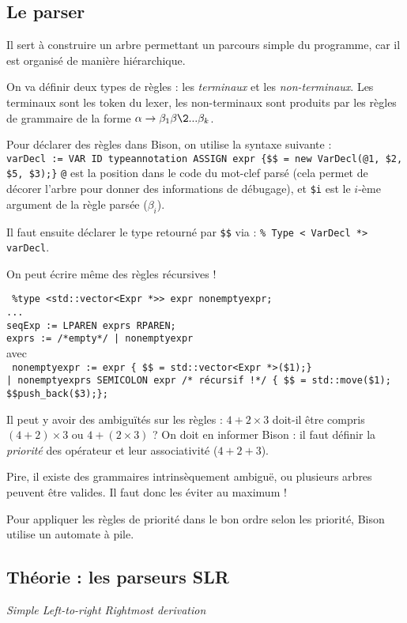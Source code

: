 \documentclass{article}
\begin{document}
\subsection{Le parser}
Il sert à construire un arbre permettant un parcours simple du programme, car il est organisé de manière hiérarchique. 

On va définir deux types de règles : les \emph{terminaux} et les \emph{non-terminaux}. Les terminaux sont les token du lexer, les non-terminaux sont produits par les règles de grammaire de la forme $\alpha \to \beta_1\beta\2...\beta_k$.

Pour déclarer des règles dans Bison, on utilise la syntaxe suivante :\\
\texttt{varDecl := VAR ID typeannotation ASSIGN expr \{\$\$ = new VarDecl(@1, \$2, \$5, \$3);\}}
\texttt{@} est la position dans le code du mot-clef parsé (cela permet de décorer l'arbre pour donner des informations de débugage), et \texttt{\$i} est le $i$-ème argument de la règle parsée ($\beta_i$).

Il faut ensuite déclarer le type retourné par \texttt{\$\$} via :
\texttt{\% Type < VarDecl *> varDecl}.

On peut écrire même des règles récursives !
\bigskip\noindent


\texttt{
\%type <std::vector<Expr *>> expr nonemptyexpr;\\
...\\
seqExp := LPAREN exprs RPAREN;\\
exprs := /*empty*/ | nonemptyexpr}\\
avec\\
\texttt{
nonemptyexpr := expr \{ \$\$ = std::vector<Expr *>({\$1});\}\\
| nonemptyexprs SEMICOLON expr /* récursif !*/ \{ \$\$ = std::move(\$1); \$\$push\_back(\$3);\};
}

Il peut y avoir des ambiguïtés sur les règles : $4+2\times 3$ doit-il être compris $(4+2)\times 3$ ou $4+(2\times 3)$ ? On doit en informer Bison : il faut définir la \emph{priorité} des opérateur et leur associativité ($4+2+3$).

Pire, il existe des grammaires intrinsèquement ambiguë, ou plusieurs arbres peuvent être valides. Il faut donc les éviter au maximum !

Pour appliquer les règles de priorité dans le bon ordre selon les priorité, Bison utilise un automate à pile.


\subsection{Théorie : les parseurs SLR}
\emph{Simple Left-to-right Rightmost derivation}
\end{document}
